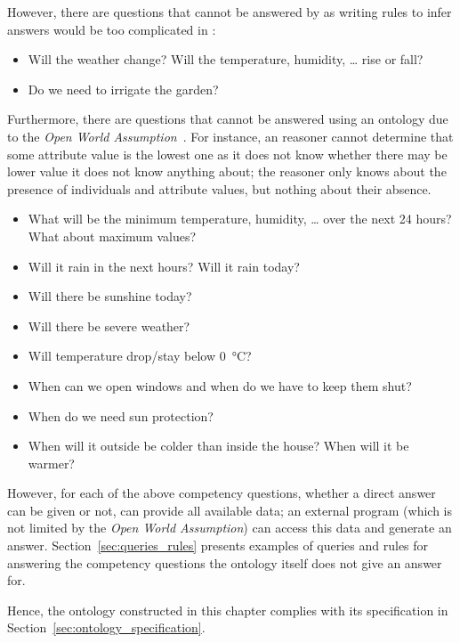 However, there are questions that cannot be answered by \smarthomeweather as writing rules to infer answers would be too complicated in :
\begin{itemize}
  \item Will the weather change? Will the temperature, humidity, … rise or fall?
  \item Do we need to irrigate the garden?
\end{itemize}

Furthermore, there are questions that cannot be answered using an  ontology due to the \emph{Open World Assumption}~\cite{open_world_assumption1}. For instance, an  reasoner cannot determine that some attribute value is the lowest one as it does not know whether there may be lower value it does not know anything about; the reasoner only knows about the presence of individuals and attribute values, but nothing about their absence.

\begin{itemize}
  \item What will be the minimum temperature, humidity, … over the next 24 hours? What about maximum values?
  \item Will it rain in the next hours? Will it rain today?
  \item Will there be sunshine today?
  \item Will there be severe weather?
  \item Will temperature drop/stay below \SI{0}{\celsius}?
  \item When can we open windows and when do we have to keep them shut?
  \item When do we need sun protection?
  \item When will it outside be colder than inside the house? When will it be warmer?
\end{itemize}

However, for each of the above competency questions, whether a direct answer can be given or not, \smarthomeweather can provide all available data; an external program (which is not limited by the \emph{Open World Assumption}) can access this data and generate an answer. Section~\ref{sec:queries_rules} presents examples of  queries and  rules for answering the competency questions the ontology itself does not give an answer for.

Hence, the ontology constructed in this chapter complies with its specification in Section~\ref{sec:ontology_specification}.

